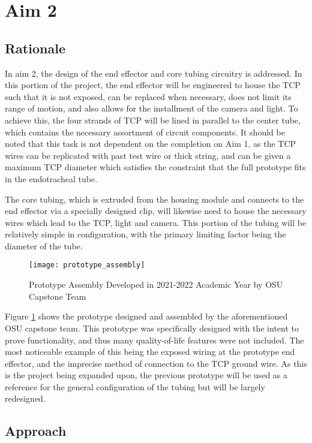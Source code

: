 \section{Aim 2}

\subsection{Rationale}

	In aim 2, the design of the end effector and core tubing circuitry is addressed. In this portion of the project, the end effector will be engineered to house the TCP such that it is not exposed, can be replaced when necessary, does not limit its range of motion, and also allows for the installment of the camera and light. To achieve this, the four strands of TCP will be lined in parallel to the center tube, which contains the necessary assortment of circuit components. It should be noted that this task is not dependent on the completion on Aim 1, as the TCP wires can be replicated with past test wire or thick string, and can be given a maximum TCP diameter which satisfies the constraint that the full prototype fits in the endotracheal tube.

	The core tubing, which is extruded from the housing module and connects to the end effector via a specially designed clip, will likewise need to house the necessary wires which lead to the TCP, light and camera. This portion of the tubing will be relatively simple in configuration, with the primary limiting factor being the diameter of the tube.

	\begin{figure}[ht]
		\centering
		\texttt{[image: prototype\_assembly]}
		\caption{Prototype Assembly Developed in 2021-2022 Academic Year by OSU Capstone Team}
		\label{fig:prototype_assembly}
	\end{figure}
	
	Figure \ref{fig:prototype_assembly} shows the prototype designed and assembled by the aforementioned OSU capstone team. This prototype was specifically designed with the intent to prove functionality, and thus many quality-of-life features were not included. The most noticeable example of this being the exposed wiring at the prototype end effector, and the imprecise method of connection to the TCP ground wire. As this is the project being expanded upon, the previous prototype will be used as a reference for the general configuration of the tubing but will be largely redesigned.

\subsection{Approach}

